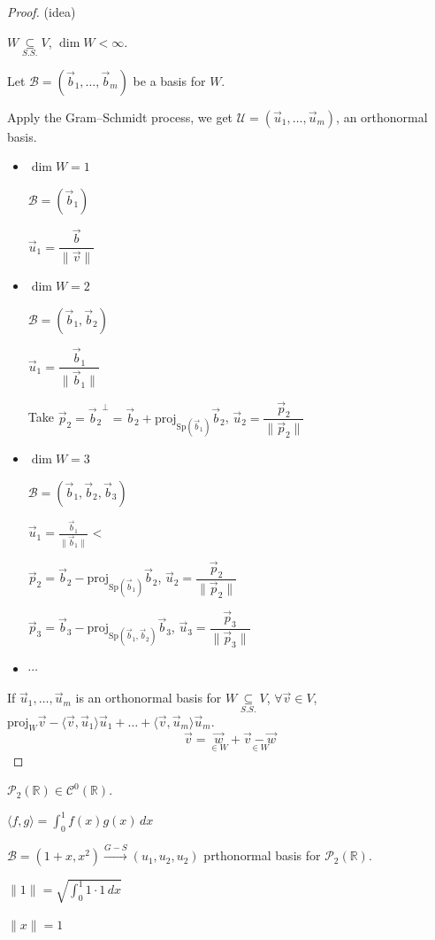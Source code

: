 \documentclass[11pt,fleqn]{book} %
\begin{document}
\begin{proof}
    (idea)

    $W \underset{S.S.}{\subseteq} V$, $\dim W < \infty$.

    Let $\mathcal{B} = (\vec{b}_1, \dots, \vec{b}_m)$ be a basis for $W$.

    Apply the Gram–Schmidt process, we get $\mathcal{U} = (\vec{u}_1, \dots, \vec{u}_m)$, an orthonormal basis.

    \begin{itemize}
        \item $\dim W = 1$

        $\mathcal{B} = (\vec{b}_1)$

        $\vec{u}_1 = \dfrac{\vec{b}}{\|\vec{v}\|}$

        \item $\dim W =2$

        $\mathcal{B} = (\vec{b}_1, \vec{b}_2)$

        $\vec{u}_1 = \dfrac{\vec{b}_1}{\|\vec{b}_1\|}$

        Take $\vec{p}_2 = {\vec{b}_2}^\perp = \vec{b}_2 + \mathrm{proj}_{\mathrm{Sp}(\vec{b}_1)}\vec{b}_2$, $\vec{u}_2 = \dfrac{\vec{p}_2}{\|\vec{p}_2\|}$

        \item $\dim W = 3$

        $\mathcal{B} = (\vec{b}_1, \vec{b}_2, \vec{b}_3)$

        $\vec{u}_1 = \frac{\vec{b}_1}{\|\vec{b}_1\|}$ <

        $\vec{p}_2 = \vec{b}_2 - \mathrm{proj}_{\mathrm{Sp}(\vec{b}_1)}\vec{b}_2$, $\vec{u}_2 = \dfrac{\vec{p}_2}{\|\vec{p}_2\|}$

        $\vec{p}_3 = \vec{b}_3 - \mathrm{proj}_{\mathrm{Sp}(\vec{b}_1, \vec{b}_2)}\vec{b}_3$, $\vec{u}_3 = \dfrac{\vec{p}_3}{\|\vec{p}_3\|}$

        \item $\cdots$
    \end{itemize}

    If $\vec{u}_1, \dots, \vec{u}_m$ is an orthonormal basis for $W \underset{S.S.}{\subseteq} V$, $\forall \vec{v} \in V$, $\mathrm{proj}_W\vec{v} - \langle \vec{v}, \vec{u}_1 \rangle\vec{u}_1 + \dots + \langle \vec{v}, \vec{u}_m \rangle\vec{u}_m$.
    $$\vec{v} = \underset{\in W}{\vec{w}} + \underset{\in W}{\vec{v} - \vec{w}}$$
\end{proof}

\begin{example}
    $\mathcal{P}_2(\mathbb{R}) \in \mathcal{C}^0(\mathbb{R})$.

    $\langle f, g \rangle = \int_0^1 f(x)g(x)\,dx$

    $\mathcal{B} = (1 + x, x^2) \overset{G-S}{\longrightarrow} (u_1, u_2, u_2)$ prthonormal basis for $\mathcal{P}_2(\mathbb{R})$.

    $\|1\| = \sqrt{\int_0^1 1\cdot1\,dx}$

    $\|x\| = 1$
\end{example}
\end{document}
